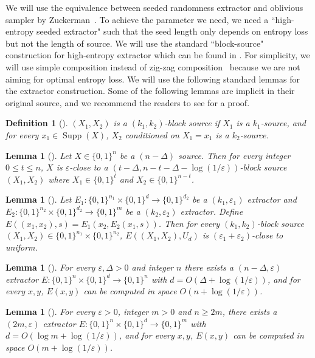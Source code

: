 \documentclass[10pt,a4paper]{article}
\newtheorem{definition}[theorem]{Definition}
\newtheorem{lemma}[theorem]{Lemma}
\DeclareMathOperator{\Supp}{Supp}
\newcommand{\bits}[1]{\{0,1\}^{#1}}
\newcommand{\eps}{\varepsilon}
\begin{document}
We will use the equivalence between seeded randomness extractor and oblivious sampler by Zuckerman~\cite{Zuc97}. To achieve the parameter we need, we need a ``high-entropy seeded extractor" such that the seed length only depends on entropy loss but not the length of source. We will use the standard ``block-source" construction for high-entropy extractor which can be found in \cite{GW97,RVW01}. For simplicity, we will use simple composition instead of zig-zag composition~\cite{RVW01} because we are not aiming for optimal entropy loss. We will use the following standard lemmas for the extractor construction. Some of the following lemmas are implicit in their original source, and we recommend the readers to see \cite{GUV09,Vad12} for a proof.
\begin{definition}[\cite{CG88}]
$(X_1,X_2)$ is a \emph{$(k_1,k_2)$-block source} if $X_1$ is a $k_1$-source, and for every $x_1\in\Supp(X)$, $X_2$ conditioned on $X_1=x_1$  is a $k_2$-source.
\end{definition}
\begin{lemma}[\cite{GW97}]\label{lemma:block}
Let $X\in\bits{n}$ be a $(n-\Delta)$ source. Then for every integer $0\le t\le n $, $X$ is $\eps$-close to a $(t-\Delta,n-t-\Delta-\log(1/\eps))$-block source $(X_1,X_2)$ where $X_1\in\bits{t}$ and $X_2\in\bits{n-t}$.
\end{lemma}
\begin{lemma}[\cite{NZ96}]\label{lemma:compo}
Let $E_1:\bits{n_1}\times\bits{d}\to\bits{d_2}$ be a $(k_1,\eps_1)$ extractor and $E_2:\bits{n_2}\times\bits{d_2}\to\bits{m}$ be a $(k_2,\eps_2)$ extractor. Define $E((x_1,x_2),s)=E_1(x_2,E_2(x_1,s))$. Then for every $(k_1,k_2)$-block source $(X_1,X_2)\in\bits{n_1}\times\bits{n_2}$, $E((X_1,X_2),U_d)$ is ${(\eps_1+\eps_2)}$-close to uniform.
\end{lemma}
\begin{lemma}[\cite{GW97}]\label{lemma:GW}
For every $\eps,\Delta>0$ and integer $n$ there exists a $(n-\Delta,\eps)$ extractor $E:\bits{n}\times\bits{d}\to\bits{n}$ with $d=O(\Delta+\log(1/\eps))$, and for every $x,y$, $E(x,y)$ can be computed in space $O(n+\log(1/\eps))$.
\end{lemma}
\begin{lemma}[\cite{GUV09,KNW08}]\label{lemma:GUV}
For every $\eps>0$, integer $m>0$ and $n\ge 2m$, there exists a $(2m,\eps)$ extractor $E:\bits{n}\times\bits{d}\to\bits{m}$ with $d=O(\log m + \log(1/\eps))$, and for every $x,y$, $E(x,y)$  can be computed in space $O(m+\log(1/\eps))$.
\end{lemma}
\end{document}
